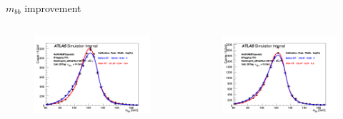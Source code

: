 \begin{frame}{$m_{bb}$ improvement}

\begin{columns}
\begin{figure}
    \centering
    \includegraphics[width=1.\textwidth]{BackUp/Part7/Img/mbb_KF_2Jet_AntiKt4EMTopoJets.png}
\end{figure}
\begin{figure}
    \centering
    \includegraphics[width=1.\textwidth]{BackUp/Part7/Img/mbb_KF_3Jet_AntiKt4EMTopoJets.png}
\end{figure}
\end{columns}
\end{frame}
\begin{frame}{}
    
\end{frame}